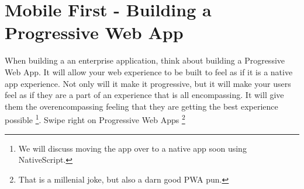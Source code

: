 \maketitle{}
\section{ Mobile First - Building a Progressive Web App }

When building a an enterprise application, think about building a Progressive
Web App. It will allow your web experience to be built to feel as if it is a
native app experience. Not only will it make it progressive, but it will make
your users feel as if they are a part of an experience that is all encompassing.
It will give them the overencompassing feeling that they are getting the best
experience possible \footnote{We will discuss moving the app over to a native
app soon using NativeScript.}. Swipe right on Progressive Web Apps \footnote{
That is a millenial joke, but also a darn good PWA pun.}
